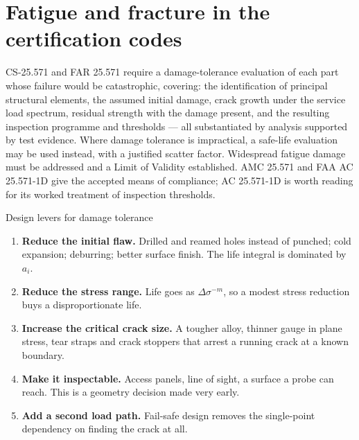 \documentclass[11pt,a4paper]{article}
\begin{document}
\section{Fatigue and fracture in the certification codes}

CS-25.571 and FAR 25.571 require a damage-tolerance evaluation of each part whose failure would be catastrophic, covering: the identification of principal structural elements, the assumed initial damage, crack growth under the service load spectrum, residual strength with the damage present, and the resulting inspection programme and thresholds --- all substantiated by analysis supported by test evidence. Where damage tolerance is impractical, a safe-life evaluation may be used instead, with a justified scatter factor. Widespread fatigue damage must be addressed and a Limit of Validity established. AMC 25.571 and FAA AC 25.571-1D give the accepted means of compliance; AC 25.571-1D is worth reading for its worked treatment of inspection thresholds.

\begin{aerobox}{Design levers for damage tolerance}
\begin{enumerate}[nosep]
  \item \textbf{Reduce the initial flaw.} Drilled and reamed holes instead of punched; cold expansion; deburring; better surface finish. The life integral is dominated by $a_i$.
  \item \textbf{Reduce the stress range.} Life goes as $\Delta\sigma^{-m}$, so a modest stress reduction buys a disproportionate life.
  \item \textbf{Increase the critical crack size.} A tougher alloy, thinner gauge in plane stress, tear straps and crack stoppers that arrest a running crack at a known boundary.
  \item \textbf{Make it inspectable.} Access panels, line of sight, a surface a probe can reach. This is a geometry decision made very early.
  \item \textbf{Add a second load path.} Fail-safe design removes the single-point dependency on finding the crack at all.
\end{enumerate}
\end{aerobox}
\end{document}
